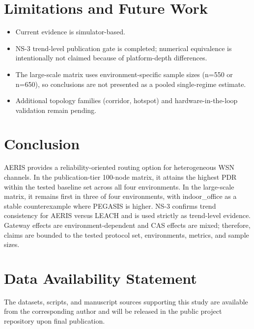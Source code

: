 \documentclass[sensors,article,submit,moreauthors,pdftex]{Definitions/mdpi}
\begin{document}
\section{Limitations and Future Work}
\begin{itemize}
\item Current evidence is simulator-based.
\item NS-3 trend-level publication gate is completed; numerical equivalence is intentionally not claimed because of platform-depth differences.
\item The large-scale matrix uses environment-specific sample sizes (n=550 or n=650), so conclusions are not presented as a pooled single-regime estimate.
\item Additional topology families (corridor, hotspot) and hardware-in-the-loop validation remain pending.
\end{itemize}

\section{Conclusion}
AERIS provides a reliability-oriented routing option for heterogeneous WSN channels. In the publication-tier 100-node matrix, it attains the highest PDR within the tested baseline set across all four environments. In the large-scale matrix, it remains first in three of four environments, with indoor\_office as a stable counterexample where PEGASIS is higher. NS-3 confirms trend consistency for AERIS versus LEACH and is used strictly as trend-level evidence. Gateway effects are environment-dependent and CAS effects are mixed; therefore, claims are bounded to the tested protocol set, environments, metrics, and sample sizes.

\section*{Data Availability Statement}
The datasets, scripts, and manuscript sources supporting this study are available from the corresponding author and will be released in the public project repository upon final publication.


\end{document}
